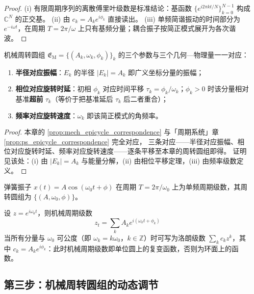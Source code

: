 \begin{proof}
(i) 有限周期序列的离散傅里叶级数是标准结论：基函数 $\{e^{i2\pi kt/N}\}_{k=0}^{N-1}$ 构成 $\mathbb C^N$ 的正交基。
(ii) 由 $c_k=A_k e^{i\phi_k}$ 直接读出。
(iii) 单频简谐振动的时间部分为 $e^{-i\omega t}$，在周期 $T=2\pi/\omega$ 上只有基频分量；耦合振子按简正模式展开为各次谐波。
\end{proof}

\begin{proposition}\label{prop:mech_epicycle_correspondence}
机械周转圆组 $\mathfrak E_{\mathrm{M}}=\{(A_k,\omega_k,\phi_k)\}_{k}$ 的三个参数与三个几何—物理量一一对应：
\begin{enumerate}[label=(\roman*)]
    \item \textbf{半径对应振幅}：$E_k$ 的半径 $|E_k|=A_k$ 即广义坐标分量的振幅；
    \item \textbf{相位对应旋转时延}：初相 $\phi_k$ 对应时间平移 $\tau_k=\phi_k/\omega_k$；$\phi_k>0$ 时该分量相对基准\textbf{超前} $\tau_k$（等价于把基准延后 $\tau_k$ 后二者重合）；
    \item \textbf{频率对应旋转速度}：$\omega_k$ 即该简正模式的角频率。
\end{enumerate}
\end{proposition}

\begin{proof}
本章的 \cref{prop:mech_epicycle_correspondence} 与「周期系统」章 \cref{prop:ps_epicycle_correspondence} 完全对应，
三条对应——半径对应振幅、相位对应旋转时延、频率对应旋转速度——逐条平移至本章的周转圆组即得。
证明见该处：(i) 由 $|E_k|=A_k$ 与能量分解，(ii) 由相位平移定理，(iii) 由频率级数定义。
\end{proof}

\begin{example}[弹簧振子的周期级数]\label{ex:mech_spring_series}
弹簧振子 $x(t)=A\cos(\omega_0t+\phi)$ 在周期 $T=2\pi/\omega_0$ 上为单频周期级数，其周转圆组为 $\{(A,\omega_0,\phi)\}$。
\end{example}

\begin{remark}[周期级数即复变函数]\label{rem:mech_series_complex}
设 $z=e^{i\omega_0t}$，则机械周期级数
\[
z_t=\sum_k A_k e^{i(\omega_k t+\phi_k)}
\]
当所有分量与 $\omega_0$ 可公度（即 $\omega_k=k\omega_0$，$k\in\mathbb Z$）时可写为洛朗级数 $\sum_k c_k z^k$，其中 $c_k=A_k e^{i\phi_k}$：此时机械周期级数即单位圆上的复变函数，否则为环面上的函数。
\end{remark}

\subsection{第三步：机械周转圆组的动态调节}

